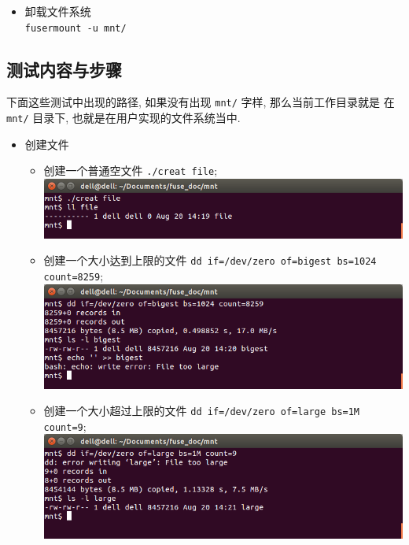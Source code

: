 \documentclass[nofonts]{ctexart}
\begin{document}
\begin{itemize}
\item
  卸载文件系统\\ \texttt{fusermount -u mnt/}
\end{itemize}

\subsection{测试内容与步骤}\label{ux6d4bux8bd5ux5185ux5bb9ux4e0eux6b65ux9aa4}

下面这些测试中出现的路径, 如果没有出现 \texttt{mnt/} 字样,
那么当前工作目录就是 在 \texttt{mnt/} 目录下,
也就是在用户实现的文件系统当中.

\begin{itemize}
\item
  创建文件
\begin{itemize}
\item
  创建一个普通空文件 \texttt{./creat file};\\
  \includegraphics[width=15cm]{./images/./creat_t1.png}
\item
  创建一个大小达到上限的文件
  \texttt{dd if=/dev/zero of=bigest bs=1024 count=8259};\\
  \includegraphics[width=15cm]{./images/./creat_t2.png}
\item
  创建一个大小超过上限的文件
  \texttt{dd if=/dev/zero of=large bs=1M count=9};\\
  \includegraphics[width=15cm]{./images/./creat_t3.png}

\end{itemize}
\end{itemize}
\end{document}
